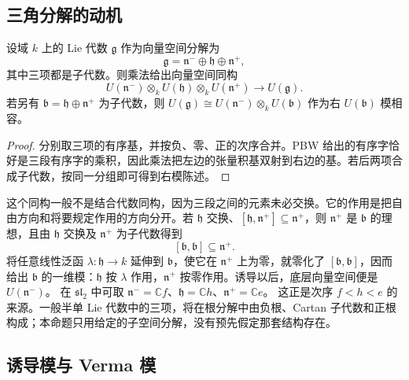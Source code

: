 \subsection{三角分解的动机}
\label{b5:subsec:1504:02}

\begin{proposition}\label{b5:prop:pbw-triangular-factorization}
	设域 \(k\) 上的 Lie 代数 \(\mathfrak g\) 作为向量空间分解为
	\[
		\mathfrak g=\mathfrak n^-\oplus\mathfrak h\oplus\mathfrak n^+,
	\]
	其中三项都是子代数。则乘法给出向量空间同构
	\[
		U(\mathfrak n^-)\otimes_kU(\mathfrak h)\otimes_kU(\mathfrak n^+) \longrightarrow U(\mathfrak g).
	\]
	若另有 \(\mathfrak b=\mathfrak h\oplus\mathfrak n^+\) 为子代数，则 \(U(\mathfrak g)\cong U(\mathfrak n^-)\otimes_kU(\mathfrak b)\) 作为右 \(U(\mathfrak b)\) 模相容。
\end{proposition}
\begin{proof}
	分别取三项的有序基，并按负、零、正的次序合并。PBW 给出的有序字恰好是三段有序字的乘积，因此乘法把左边的张量积基双射到右边的基。若后两项合成子代数，按同一分组即可得到右模陈述。
\end{proof}
这个同构一般不是结合代数同构，因为三段之间的元素未必交换。它的作用是把自由方向和将要规定作用的方向分开。若 \(\mathfrak h\) 交换、\([\mathfrak h,\mathfrak n^+]\subseteq\mathfrak n^+\)，则 \(\mathfrak n^+\) 是 \(\mathfrak b\) 的理想，且由 \(\mathfrak h\) 交换及 \(\mathfrak n^+\) 为子代数得到
\[
	[\mathfrak b,\mathfrak b]\subseteq\mathfrak n^+.
\]
将任意线性泛函 \(\lambda:\mathfrak h\to k\) 延伸到 \(\mathfrak b\)，使它在 \(\mathfrak n^+\) 上为零，就零化了 \([\mathfrak b,\mathfrak b]\)，因而给出 \(\mathfrak b\) 的一维模：\(\mathfrak h\) 按 \(\lambda\) 作用，\(\mathfrak n^+\) 按零作用。诱导以后，底层向量空间便是 \(U(\mathfrak n^-)\)。
\ProseParagraphBreak
在 \(\mathfrak{sl}_2\) 中可取 \(\mathfrak n^-=\mathbb Cf\)、\(\mathfrak h=\mathbb Ch\)、\(\mathfrak n^+=\mathbb Ce\)。 这正是次序 \(f<h<e\) 的来源。一般半单 Lie 代数中的三项，将在根分解中由负根、Cartan 子代数和正根构成；本命题只用给定的子空间分解，没有预先假定那套结构存在。

\subsection{诱导模与 Verma 模}
\label{b5:subsec:1504:03}

